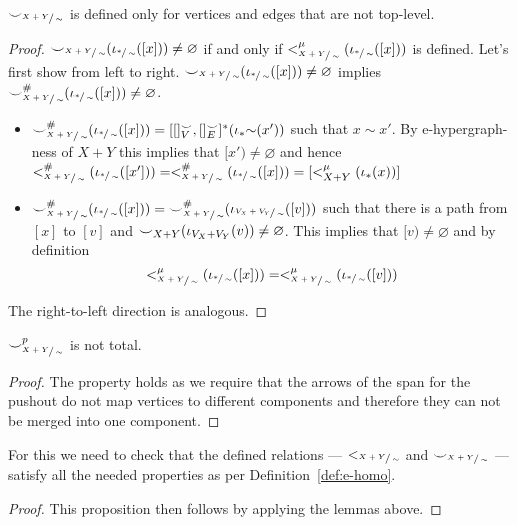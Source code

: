 \begin{lemma}
\label{lemma:consistency_child}
    ${\smile}_{\sfrac{X+Y}{\sim}}$ is defined only for vertices and edges that are not top-level.
\end{lemma}
\begin{proof}
  ${\smile}_{\sfrac{X+Y}{\sim}}(\iota_{\sfrac{*}{\sim}}([x])) \not = \varnothing$ if and only if $<_{\sfrac{X+Y}{\sim}}^{\mu}(\iota_{\sfrac{*}{\sim}}([x]))$ is defined.
  Let's first show from left to right. ${\smile}_{\sfrac{X+Y}{\sim}}(\iota_{\sfrac{*}{\sim}}([x])) \not = \varnothing$ implies ${\smile}_{\sfrac{X+Y}{\sim}}^{{\#}}(\iota_{\sfrac{*}{\sim}}([x])) \not = \varnothing$.
  \begin{itemize}
    \item ${\smile}_{\sfrac{X+Y}{\sim}}^{{\#}}(\iota_{\sfrac{*}{\sim}}([x])) = [[]_{V}^{{\smile}},[]_{E}^{{\smile}}]^{*}(\iota_{*}{\sim}(x'))$ such that $x \sim x'$.
          By e-hypergraph-ness of $X+Y$ this implies that $[x') \not = \varnothing$ and hence $<_{\sfrac{X+Y}{\sim}}^{{\#}}(\iota_{\sfrac{*}{\sim}}([x'])) = <_{\sfrac{X+Y}{\sim}}^{{\#}}(\iota_{\sfrac{*}{\sim}}([x])) = [<_{X+Y}^{\mu}(\iota_{*}(x))]$
    \item ${\smile}_{\sfrac{X+Y}{\sim}}^{{\#}}(\iota_{\sfrac{*}{\sim}}([x])) = {\smile}_{\sfrac{X+Y}{\sim}}^{{\#}}(\iota_{\sfrac{V_{X} + V_{Y}}{\sim}}([v]))$ such that there is a path from $[x]$ to $[v]$ and
          ${\smile}_{X+Y}(\iota_{V_{X} + V_{Y}}(v)) \not = \varnothing$. This implies that $[v) \not = \varnothing$ and by definition
          \[
            <_{\sfrac{X+Y}{\sim}}^{\mu}(\iota_{\sfrac{*}{\sim}}([x])) = <_{\sfrac{X+Y}{\sim}}^{\mu}(\iota_{\sfrac{*}{\sim}}([v]))  
          \]
  \end{itemize}
  The right-to-left direction is analogous.
\end{proof}


\begin{lemma}
${\smile}_{\sfrac{X+Y}{\sim}}^{p}$ is not total.
\end{lemma}
\begin{proof}
The property holds as we require that the arrows of the span for the pushout do not map vertices to different components and therefore they can not be merged into one component.
\end{proof}

\begin{proposition}
\label{prop:pushout_is_e_hypergraph}
For this we need to check that the defined relations --- $<_{\sfrac{X+Y}{\sim}}$ and ${\smile}_{\sfrac{X+Y}{\sim}}$ --- satisfy all the needed properties as per Definition~\ref{def:e-homo}.
\end{proposition}
\begin{proof}
    This proposition then follows by applying the lemmas above.
\end{proof}


